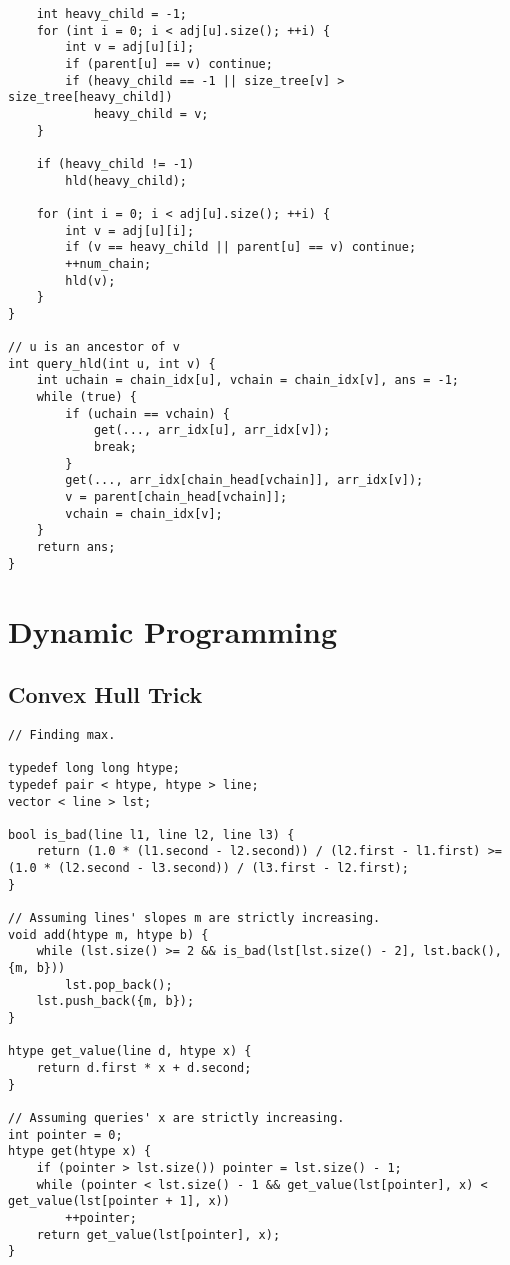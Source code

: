 \documentclass[10pt,landscape]{article}
\begin{document}
\begin{multicols}{2}
\begin{lstlisting}
    int heavy_child = -1;
    for (int i = 0; i < adj[u].size(); ++i) {
        int v = adj[u][i];
        if (parent[u] == v) continue;
        if (heavy_child == -1 || size_tree[v] > size_tree[heavy_child])
            heavy_child = v;
    }

    if (heavy_child != -1)
        hld(heavy_child);

    for (int i = 0; i < adj[u].size(); ++i) {
        int v = adj[u][i];
        if (v == heavy_child || parent[u] == v) continue;
        ++num_chain;
        hld(v);
    }
}

// u is an ancestor of v
int query_hld(int u, int v) {
    int uchain = chain_idx[u], vchain = chain_idx[v], ans = -1;
    while (true) {
        if (uchain == vchain) {
            get(..., arr_idx[u], arr_idx[v]);
            break;
        }
        get(..., arr_idx[chain_head[vchain]], arr_idx[v]);
        v = parent[chain_head[vchain]];
        vchain = chain_idx[v];
    }
    return ans;
}
\end{lstlisting}
\section{Dynamic Programming}
\subsection{Convex Hull Trick}
\begin{lstlisting}
// Finding max.

typedef long long htype;
typedef pair < htype, htype > line;
vector < line > lst;

bool is_bad(line l1, line l2, line l3) {
    return (1.0 * (l1.second - l2.second)) / (l2.first - l1.first) >= (1.0 * (l2.second - l3.second)) / (l3.first - l2.first);
}

// Assuming lines' slopes m are strictly increasing.
void add(htype m, htype b) {
    while (lst.size() >= 2 && is_bad(lst[lst.size() - 2], lst.back(), {m, b}))
        lst.pop_back();
    lst.push_back({m, b});
}

htype get_value(line d, htype x) {
    return d.first * x + d.second;
}

// Assuming queries' x are strictly increasing.
int pointer = 0;
htype get(htype x) {
    if (pointer > lst.size()) pointer = lst.size() - 1;
    while (pointer < lst.size() - 1 && get_value(lst[pointer], x) < get_value(lst[pointer + 1], x))
        ++pointer;
    return get_value(lst[pointer], x);
}
\end{lstlisting}

\end{multicols}
\end{document}

